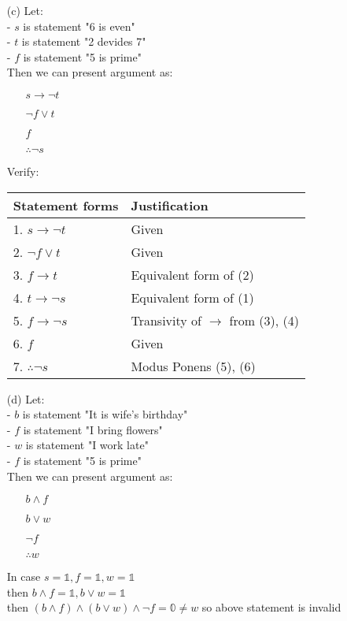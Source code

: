 \begin{enumerate}
    \newpage
    \item[(c)] Let: \\
        - $s$ is statement "6 is even" \\
        - $t$ is statement "2 devides 7" \\
        - $f$ is statement "5 is prime" \\
        Then we can present argument as:
        \begin{enumerate}
            \item[] $s \rightarrow \neg t$
            \item[] $\neg f \lor t$
            \item[] $f$
            \item[] $\therefore \neg s$
        \end{enumerate}
        Verify:
        \begin{table}[hbt!]
            \centering
            \begin{tabular}{|l | l|}
            \hline
            Statement forms & Justification\\ [0.5ex]
            \hline
                1. $s \rightarrow \neg t$ & Given \\
                2. $\neg f \lor t$ & Given \\
                3. $f \rightarrow t$ & Equivalent form of (2) \\
                4. $t \rightarrow \neg s$ & Equivalent form of (1) \\
                5. $f \rightarrow \neg s$ & Transivity of $\rightarrow$ from (3), (4) \\
                6. $f$ & Given \\
                7. $\therefore \neg s$ & Modus Ponens (5), (6) \\
            \hline
            \end{tabular}
        \end{table}

    \item[(d)] Let: \\
        - $b$ is statement "It is wife's birthday" \\
        - $f$ is statement "I bring flowers" \\
        - $w$ is statement "I work late" \\
        - $f$ is statement "5 is prime" \\
        Then we can present argument as:
        \begin{enumerate}
            \item[] $b \land f$
            \item[] $b \lor w$
            \item[] $\neg f$
            \item[] $\therefore w$
        \end{enumerate}
        In case $s=\mathbb{1}, f=\mathbb{1}, w=\mathbb{1}$ \\
        then $b\land f = \mathbb{1}, b\lor w = \mathbb{1}$ \\
        then $(b\land f) \land (b\lor w) \land \neg f = \mathbb{0} \neq w$ so above statement is invalid
    

\end{enumerate}
